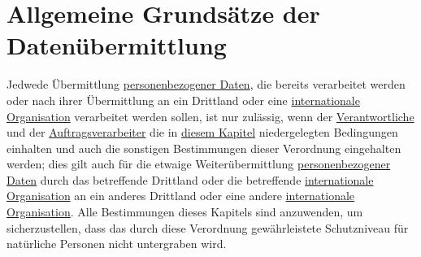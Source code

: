 \chapter{Allgemeine Grundsätze der Datenübermittlung}
\label{ch:44}


Jedwede Übermittlung \hyperref[itm:04-1]{personenbezogener Daten}, die bereits verarbeitet werden oder nach ihrer Übermittlung an ein
Drittland oder eine \hyperref[itm:04-29]{internationale Organisation} verarbeitet werden sollen, ist nur zulässig, wenn der \hyperref[itm:04-7]{Verantwortliche}
und der \hyperref[itm:04-8]{Auftragsverarbeiter} die in \hyperref[part:5]{diesem Kapitel} niedergelegten Bedingungen einhalten und auch die
sonstigen Bestimmungen dieser Verordnung eingehalten werden; dies gilt auch für die etwaige Weiterübermittlung
\hyperref[itm:04-1]{personenbezogener Daten} durch das betreffende Drittland oder die betreffende \hyperref[itm:04-29]{internationale Organisation} an ein anderes
Drittland oder eine andere \hyperref[itm:04-29]{internationale Organisation}. Alle Bestimmungen dieses Kapitels sind anzuwenden, um
sicherzustellen, dass das durch diese Verordnung gewährleistete Schutzniveau für natürliche Personen nicht untergraben
wird.


